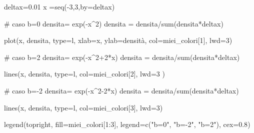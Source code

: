 \documentclass[
  italian,
  letterpaper,
]{book}
\newenvironment{Shaded}{\begin{snugshade}}{\end{snugshade}}
\newcommand{\AttributeTok}[1]{\textcolor[rgb]{0.40,0.45,0.13}{#1}}
\newcommand{\CommentTok}[1]{\textcolor[rgb]{0.37,0.37,0.37}{#1}}
\newcommand{\DecValTok}[1]{\textcolor[rgb]{0.68,0.00,0.00}{#1}}
\newcommand{\FloatTok}[1]{\textcolor[rgb]{0.68,0.00,0.00}{#1}}
\newcommand{\FunctionTok}[1]{\textcolor[rgb]{0.28,0.35,0.67}{#1}}
\newcommand{\NormalTok}[1]{\textcolor[rgb]{0.00,0.23,0.31}{#1}}
\newcommand{\OtherTok}[1]{\textcolor[rgb]{0.00,0.23,0.31}{#1}}
\newcommand{\SpecialCharTok}[1]{\textcolor[rgb]{0.37,0.37,0.37}{#1}}
\newcommand{\StringTok}[1]{\textcolor[rgb]{0.13,0.47,0.30}{#1}}
\theoremstyle{definition}
\theoremstyle{remark}
\begin{document}
\begin{Shaded}
\begin{Highlighting}[]
\NormalTok{deltax}\OtherTok{=}\FloatTok{0.01}
\NormalTok{x }\OtherTok{=}\FunctionTok{seq}\NormalTok{(}\SpecialCharTok{{-}}\DecValTok{3}\NormalTok{,}\DecValTok{3}\NormalTok{,}\AttributeTok{by=}\NormalTok{deltax)}

\CommentTok{\# caso b=0}
\NormalTok{densita}\OtherTok{=} \FunctionTok{exp}\NormalTok{(}\SpecialCharTok{{-}}\NormalTok{x}\SpecialCharTok{\^{}}\DecValTok{2}\NormalTok{)}
\NormalTok{densita }\OtherTok{=}\NormalTok{ densita}\SpecialCharTok{/}\FunctionTok{sum}\NormalTok{(densita}\SpecialCharTok{*}\NormalTok{deltax)}

\FunctionTok{plot}\NormalTok{(x, densita, }\AttributeTok{type=}\StringTok{\textquotesingle{}l\textquotesingle{}}\NormalTok{, }\AttributeTok{xlab=}\StringTok{\textquotesingle{}x\textquotesingle{}}\NormalTok{, }\AttributeTok{ylab=}\StringTok{\textquotesingle{}densità\textquotesingle{}}\NormalTok{, }\AttributeTok{col=}\NormalTok{miei\_colori[}\DecValTok{1}\NormalTok{], }\AttributeTok{lwd=}\DecValTok{3}\NormalTok{)}

\CommentTok{\# caso b=2}
\NormalTok{densita}\OtherTok{=} \FunctionTok{exp}\NormalTok{(}\SpecialCharTok{{-}}\NormalTok{x}\SpecialCharTok{\^{}}\DecValTok{2}\SpecialCharTok{+}\DecValTok{2}\SpecialCharTok{*}\NormalTok{x)}
\NormalTok{densita }\OtherTok{=}\NormalTok{ densita}\SpecialCharTok{/}\FunctionTok{sum}\NormalTok{(densita}\SpecialCharTok{*}\NormalTok{deltax)}

\FunctionTok{lines}\NormalTok{(x, densita, }\AttributeTok{type=}\StringTok{\textquotesingle{}l\textquotesingle{}}\NormalTok{,  }\AttributeTok{col=}\NormalTok{miei\_colori[}\DecValTok{2}\NormalTok{], }\AttributeTok{lwd=}\DecValTok{3}\NormalTok{ )}


\CommentTok{\# caso b={-}2}
\NormalTok{densita}\OtherTok{=} \FunctionTok{exp}\NormalTok{(}\SpecialCharTok{{-}}\NormalTok{x}\SpecialCharTok{\^{}}\DecValTok{2{-}2}\SpecialCharTok{*}\NormalTok{x)}
\NormalTok{densita }\OtherTok{=}\NormalTok{ densita}\SpecialCharTok{/}\FunctionTok{sum}\NormalTok{(densita}\SpecialCharTok{*}\NormalTok{deltax)}

\FunctionTok{lines}\NormalTok{(x, densita, }\AttributeTok{type=}\StringTok{\textquotesingle{}l\textquotesingle{}}\NormalTok{,  }\AttributeTok{col=}\NormalTok{miei\_colori[}\DecValTok{3}\NormalTok{], }\AttributeTok{lwd=}\DecValTok{3}\NormalTok{)}

\FunctionTok{legend}\NormalTok{(}\StringTok{\textquotesingle{}topright\textquotesingle{}}\NormalTok{, }\AttributeTok{fill=}\NormalTok{miei\_colori[}\DecValTok{1}\SpecialCharTok{:}\DecValTok{3}\NormalTok{], }\AttributeTok{legend=}\FunctionTok{c}\NormalTok{(}\StringTok{"b=0"}\NormalTok{, }\StringTok{"b={-}2"}\NormalTok{, }\StringTok{"b=2"}\NormalTok{), }\AttributeTok{cex=}\FloatTok{0.8}\NormalTok{)}
\end{Highlighting}
\end{Shaded}
\end{document}
